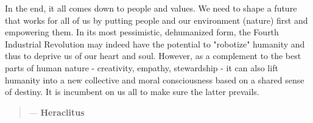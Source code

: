     In the end, it all comes down to people and values. We need to shape a future that works for all of us by putting people and our environment (nature) first and empowering them. In its most pessimistic, dehumanized form, the Fourth Industrial Revolution may indeed have the potential to "robotize" humanity and thus to deprive us of our heart and soul. However, as a complement to the best parts of human nature - creativity, empathy, stewardship - it can also lift humanity into a new collective and moral consciousness based on a shared sense of destiny. It is incumbent on us all to make sure the latter prevails.
    
    
    \begin{quotation}

      \textit{}
      \begin{flushright}
        \small{--- \textbf{Heraclitus}}
      \end{flushright}
    
    \end{quotation}

